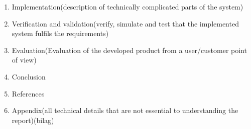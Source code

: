 \begin{enumerate}
\begin{enumerate}
        \end{enumerate}
    \item Implementation(description of technically complicated parts of the system)
    \item Verification and validation(verify, simulate and test that the implemented system fulfils the requirements)
    \item Evaluation(Evaluation of the developed product from a user/customer point of view)
    \item Conclusion
    \item References
    \item Appendix(all technical details that are not essential to understanding the report)(bilag)
\end{enumerate}
